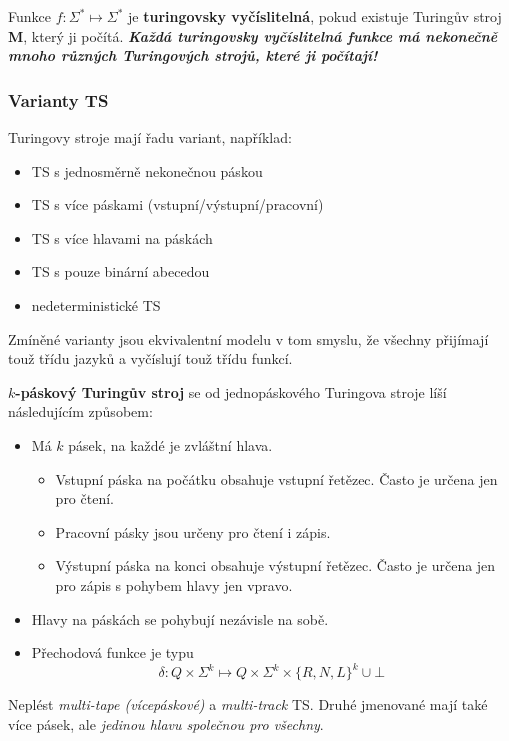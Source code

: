 \documentclass[11pt]{report} %
\begin{document}
Funkce $f : \Sigma^* \mapsto \Sigma^*$ je \textbf{turingovsky vyčíslitelná}, pokud existuje Turingův stroj \textbf{M}, který ji počítá. \textbf{\textit{Každá turingovsky vyčíslitelná funkce má nekonečně mnoho různých Turingových strojů, 	které ji počítají!}}

\subsubsection{Varianty TS}
Turingovy stroje mají řadu variant, například:
\begin{itemize}
	\leftskip 40pt
	\setlength{\itemsep}{0pt}
	\item TS s jednosměrně nekonečnou páskou
	\item TS s více páskami (vstupní/výstupní/pracovní)
	\item TS s více hlavami na páskách
	\item TS s pouze binární abecedou
	\item nedeterministické TS
\end{itemize}
Zmíněné varianty jsou ekvivalentní  modelu v tom smyslu, že všechny přijímají touž třídu jazyků a vyčíslují touž třídu funkcí.

\textbf{$k$-páskový Turingův stroj} se od jednopáskového Turingova stroje líší následujícím způsobem:
\begin{itemize}
	\leftskip 40pt
	\setlength{\itemsep}{0pt}
	\item Má $k$ pásek, na každé je zvláštní hlava.
	\begin{itemize}
		\leftskip 40pt
		\setlength{\itemsep}{0pt}	
		\item Vstupní páska na počátku obsahuje vstupní řetězec. Často je určena jen pro čtení.
		\item Pracovní pásky jsou určeny pro čtení i zápis.
		\item Výstupní páska na konci obsahuje výstupní řetězec. Často je určena jen pro zápis s pohybem hlavy jen vpravo.
	\end{itemize}
	\item Hlavy na páskách se pohybují nezávisle na sobě.
	\item Přechodová funkce je typu
		$$\delta : Q \times \Sigma^k \mapsto Q \times \Sigma^k \times \{R, N, L\}^k \cup {\bot}$$
\end{itemize}

Neplést \textit{multi-tape (vícepáskové)} a \textit{multi-track} TS. Druhé jmenované mají také více pásek, ale \textit{jedinou hlavu společnou pro všechny}.
\end{document}
